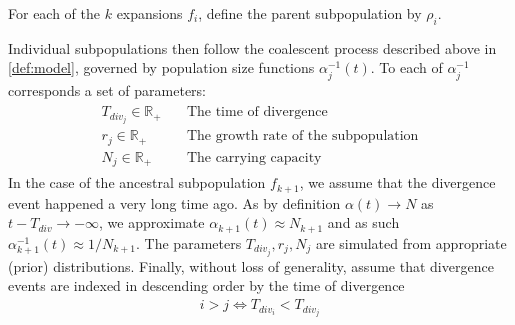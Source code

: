 \documentclass{report}
\newcommand{\R}{\mathbb{R}}
\theoremstyle{definition}
\begin{document}
For each of the $k$ expansions $f_i$, define the parent subpopulation by $\rho_i$.

Individual subpopulations then follow the coalescent process described above in \ref{def:model}, governed by population size functions $\alpha^{-1}_{j}(t)$. To each of $\alpha^{-1}_{j}$ corresponds a set of parameters:
\begin{gather}
\begin{aligned}
T_{div_{j}}\in\R_+ \quad&\text{The time of divergence}\\
r_j\in\R_+\quad&\text{The growth rate of the subpopulation}\\
N_j\in\R_+\quad&\text{The carrying capacity}
\end{aligned}
\end{gather}
In the case of the ancestral subpopulation $f_{k+1}$, we assume that the divergence event happened a very long time ago. As by definition $\alpha(t) \rightarrow N$ as $t-T_{div}\rightarrow -\infty$, we approximate $\alpha_{k+1}(t) \approx N_{k+1}$ and as such $\alpha^{-1}_{k+1}(t) \approx 1/N_{k+1}$. The parameters $T_{div_{j}}, r_j, N_j$ are simulated from appropriate (prior) distributions.
Finally, without loss of generality, assume that divergence events are indexed in descending order by the time of divergence
\begin{gather}
i > j \Leftrightarrow T_{div_i} < T_{div_j}  
\end{gather}
\end{document}
